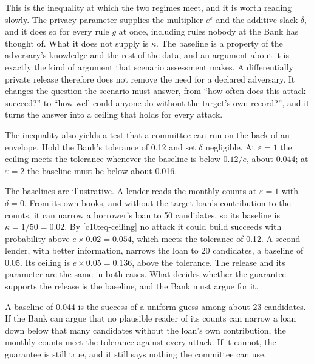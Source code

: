This is the inequality at which the two regimes meet, and it is worth reading
slowly. The privacy parameter supplies the multiplier $e^\varepsilon$ and the
additive slack $\delta$, and it does so for every rule $g$ at once, including
rules nobody at the Bank has thought of. What it does not supply is $\kappa$. The
baseline is a property of the adversary's knowledge and the rest of the data, and
an argument about it is exactly the kind of argument that scenario assessment
makes. A differentially private release therefore does not remove the need for a
declared adversary. It changes the question the scenario must answer, from ``how
often does this attack succeed?'' to ``how well could anyone do without the
target's own record?'', and it turns the answer into a ceiling that holds for
every attack.

The inequality also yields a test that a committee can run on the back of an
envelope. Hold the Bank's tolerance of 0.12 and set $\delta$ negligible. At
$\varepsilon = 1$ the ceiling meets the tolerance whenever the baseline is below
$0.12/e$, about 0.044; at $\varepsilon = 2$ the baseline must be below about
0.016.

\begin{example}\label{c10:ex-lenders}
The baselines are illustrative. A lender reads the monthly counts at $\varepsilon = 1$
with $\delta = 0$. From its own books, and without the target loan's contribution to the
counts, it can narrow a borrower's loan to 50 candidates, so its baseline is
$\kappa = 1/50 = 0.02$. By \eqref{c10:eq-ceiling} no attack it could build succeeds with
probability above $e \times 0.02 = 0.054$, which meets the tolerance of 0.12. A second
lender, with better information, narrows the loan to 20 candidates, a baseline of 0.05.
Its ceiling is $e \times 0.05 = 0.136$, above the tolerance. The release and its
parameter are the same in both cases. What decides whether the guarantee supports the
release is the baseline, and the Bank must argue for it.
\end{example}

A baseline of 0.044 is the success of a uniform guess among about 23 candidates.
If the Bank can argue that no plausible reader of its counts can narrow a loan down
below that many candidates without the loan's own contribution, the monthly
counts meet the tolerance against every attack. If it cannot, the guarantee is
still true, and it still says nothing the committee can use.

